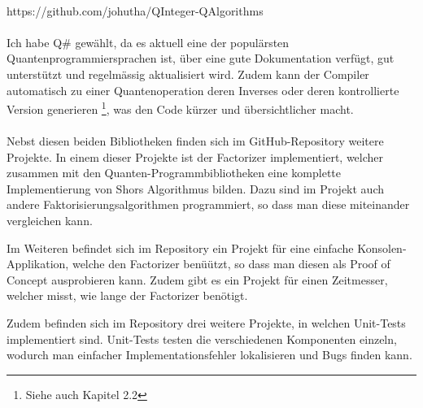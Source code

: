 \paragraph{}
\centerline{ https://github.com/johutha/QInteger-QAlgorithms }
\paragraph{}

Ich habe Q\# gewählt, da es aktuell eine der populärsten Quantenprogrammiersprachen ist, über eine gute Dokumentation verfügt, gut unterstützt und regelmässig aktualisiert wird. Zudem kann der Compiler automatisch zu einer Quantenoperation deren Inverses oder deren kontrollierte Version generieren \footnote{Siehe auch Kapitel 2.2}, was den Code kürzer und übersichtlicher macht.

\paragraph{}

Nebst diesen beiden Bibliotheken finden sich im GitHub-Repository weitere Projekte. In einem dieser Projekte ist der \grqq Factorizer\grqq{} implementiert, welcher zusammen mit den Quanten-Programmbibliotheken eine komplette Implementierung von Shors Algorithmus bilden. Dazu sind im Projekt auch andere Faktorisierungsalgorithmen programmiert, so dass man diese miteinander vergleichen kann.

Im Weiteren befindet sich im Repository ein Projekt für eine einfache Konsolen-Applikation, welche den \grqq Factorizer\grqq{} benüützt, so dass man diesen als Proof of Concept ausprobieren kann. Zudem gibt es ein Projekt für einen Zeitmesser, welcher misst, wie lange der \grqq Factorizer \grqq{} benötigt.

Zudem befinden sich im Repository drei weitere Projekte, in welchen Unit-Tests implementiert sind. Unit-Tests testen die verschiedenen Komponenten einzeln, wodurch man einfacher Implementationsfehler lokalisieren und Bugs finden kann.